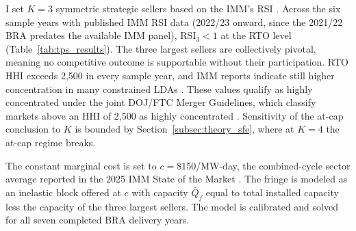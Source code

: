 I set $K = 3$ symmetric strategic sellers based on the IMM's
RSI \citep{MonitoringAnalytics2025_sotm}. Across the six sample years
with published IMM RSI data (2022/23 onward, since the 2021/22 BRA
predates the available IMM panel), $\mathrm{RSI}_3 < 1$ at the RTO
level (Table~\ref{tab:tps_results}). The three largest sellers are
collectively pivotal, meaning no competitive outcome is supportable
without their participation. RTO HHI exceeds 2{,}500 in every sample year, and IMM reports
indicate still higher concentration in many constrained LDAs
\citep{MonitoringAnalytics2025_sotm}. These values qualify as
highly concentrated under the joint DOJ/FTC Merger
Guidelines, which classify markets above an HHI of 2{,}500 as
highly concentrated \citep{DOJFTC2023_merger_guidelines}.
Sensitivity of the at-cap conclusion to $K$ is bounded by
Section~\ref{subsec:theory_sfe}, where at $K = 4$ the at-cap regime
breaks.

The constant marginal cost is set to $c = \$150$/MW-day, the
combined-cycle sector average reported in the 2025 IMM State of the
Market \citep[Table~7-38, \$149.32, rounded]{MonitoringAnalytics2025_sotm}.
The fringe is modeled as an inelastic block offered at $c$ with capacity
$\bar Q_f$ equal to total installed capacity less the capacity of the
three largest sellers. The model is calibrated and solved for all seven
completed BRA delivery years.
